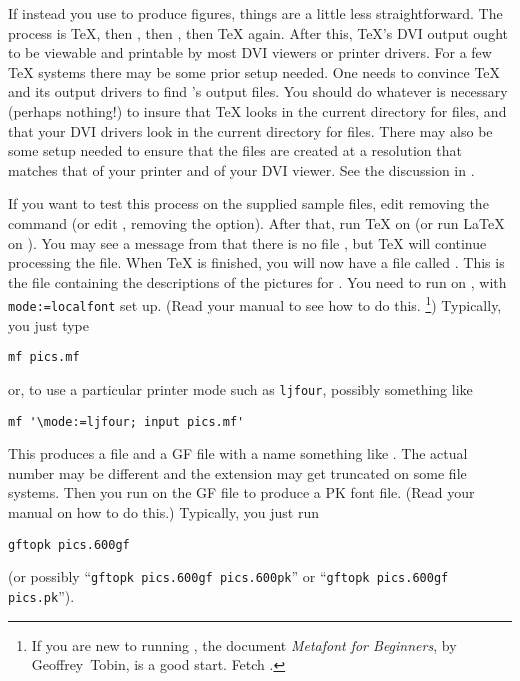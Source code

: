\documentclass[letterpaper]{article}
\begin{document}
If instead you use \mfp{} to produce \MF{} figures, things are a little
less straightforward. The process is \TeX{}, then \MF{}, then
, then \TeX{} again. After this, \TeX{}'s DVI output ought
to be viewable and printable by most DVI viewers or printer drivers. For
a few \TeX{} systems there may be some prior setup needed. One needs to
convince \TeX{} and its output drivers to find \MF{}'s output files. You
should do whatever is necessary (perhaps nothing!) to insure that \TeX{}
looks in the current directory for  files, and that your DVI
drivers look in the current directory for  files. There may
also be some setup needed to ensure that the  files are
created at a resolution that matches that of your printer and of your
DVI viewer. See the discussion in .

If you want to test this process on the supplied sample files, edit
 removing the  command (or edit
, removing the  option). After that,
run \TeX{} on  (or run \LaTeX{} on
). You may see a message from \mfp{} that there is
no file , but \TeX{} will continue processing the file.
When \TeX{} is finished, you will now have a file called .
This is the \MF{} file containing the descriptions of the pictures for
. You need to run \MF{} on , with
\texttt{mode:=localfont} set up.
(Read your \MF{} manual to see how to do this.%
    \footnote{If you are new to running \MF{}, the document
    \textit{Metafont for Beginners}, by Geoffrey~Tobin, is a good
    start. Fetch .}) %
Typically, you just type
\begin{verbatim}
mf pics.mf
\end{verbatim}
or, to use a particular printer mode such as \texttt{ljfour}, possibly
something like
\begin{verbatim}
mf '\mode:=ljfour; input pics.mf'
\end{verbatim}
This produces a  file and a GF file with a name something
like . The actual number may be different and the
extension may get truncated on some file systems. Then you run
 on the GF file to produce a PK font file. (Read your
 manual on how to do this.) Typically, you just run
\begin{verbatim}
gftopk pics.600gf
\end{verbatim}
(or possibly ``\verb$gftopk pics.600gf pics.600pk$'' or
``\verb$gftopk pics.600gf pics.pk$'').
\end{document}
